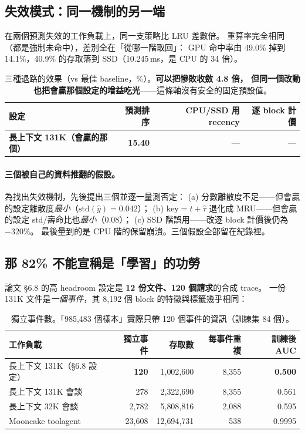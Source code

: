 \documentclass[11pt]{article}
\newcommand{\key}[1]{\textcolor{hlcol}{\textbf{#1}}}
\begin{document}
\subsection{失效模式：同一機制的另一端}
在兩個預測失效的工作負載上，同一支策略比 LRU 差數倍。
重算率完全相同（都是強制未命中），差別全在「從哪一階取回」：
GPU 命中率由 49.0\% 掉到 14.1\%，40.9\% 的存取落到 SSD（10.245\,ms，是 CPU 的 34 倍）。

\begin{table}[htbp]\centering\small
\caption{三種退路的效果（vs 最佳 baseline，\%）。\key{可以把慘敗收斂 4.8 倍，
但同一個改動也把會贏那個設定的增益吃光}——這條軸沒有安全的固定預設值。}
\begin{tabular}{lrrr}
\toprule
設定 & 預測排序 & CPU/SSD 用 recency & 逐 block 計價 \\
\midrule
\textbf{長上下文 131K（會贏的那個）} & \textbf{15.40} & — & — \\
\bottomrule
\end{tabular}
\end{table}

\paragraph{三個被自己的資料推翻的假設。}
為找出失效機制，先後提出三個並逐一量測否定：
(a) 分數離散度不足——但會贏的設定離散度\emph{最小}（$\mathrm{std}(\hat y)=0.042$）；
(b) $\mathrm{key}=t+\hat\tau$ 退化成 MRU——但會贏的設定 std/壽命比也\emph{最小}（0.08）；
(c) SSD 階誤用——改逐 block 計價後仍為 $-320\%$。
最後量到的是 CPU 階的保留崩潰。三個假設全部留在紀錄裡。

\subsection{那 82\% 不能宣稱是「學習」的功勞}
\label{sec:events}
論文 §6.8 的高 headroom 設定是 \textbf{12 份文件、120 個請求}的合成 trace。
一份 131K 文件是\emph{一個事件}，其 8{,}192 個 block 的特徵與標籤幾乎相同：

\begin{table}[htbp]\centering\small
\caption{獨立事件數。「985{,}483 個樣本」實際只帶 120 個事件的資訊（訓練集 84 個）。}
\begin{tabular}{lrrrr}
\toprule
工作負載 & 獨立事件 & 存取數 & 每事件重複 & 訓練後 AUC \\
\midrule
長上下文 131K（§6.8 設定） & \textbf{120} & 1{,}002{,}600 & 8{,}355 & \textbf{0.500} \\
長上下文 131K 會談 & 278 & 2{,}322{,}690 & 8{,}355 & 0.561 \\
長上下文 32K 會談 & 2{,}782 & 5{,}808{,}816 & 2{,}088 & 0.595 \\
Mooncake toolagent & 23{,}608 & 12{,}694{,}731 & 538 & 0.9995 \\
\bottomrule
\end{tabular}
\end{table}
\end{document}
